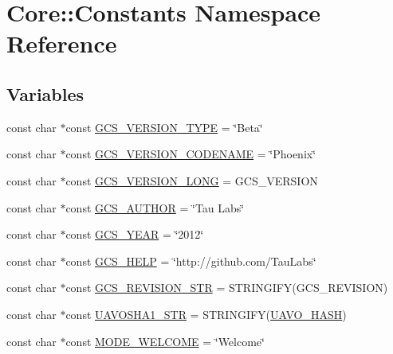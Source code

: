 \hypertarget{namespace_core_1_1_constants}{\section{\-Core\-:\-:\-Constants \-Namespace \-Reference}
\label{namespace_core_1_1_constants}
}
\subsection*{\-Variables}
\begin{DoxyCompactItemize}
\item 
const char $\ast$const \hyperlink{group___core_plugin_ga2f5847f505e3abb79af9a5dce306f252}{\-G\-C\-S\-\_\-\-V\-E\-R\-S\-I\-O\-N\-\_\-\-T\-Y\-P\-E} = \char`\"{}\-Beta\char`\"{}
\item 
const char $\ast$const \hyperlink{group___core_plugin_gad9af54d61e473a2cf1b31c9e834508fa}{\-G\-C\-S\-\_\-\-V\-E\-R\-S\-I\-O\-N\-\_\-\-C\-O\-D\-E\-N\-A\-M\-E} = \char`\"{}\-Phoenix\char`\"{}
\item 
const char $\ast$const \hyperlink{group___core_plugin_ga94cc5148063bb8fd71e94b6929e8c9ee}{\-G\-C\-S\-\_\-\-V\-E\-R\-S\-I\-O\-N\-\_\-\-L\-O\-N\-G} = \-G\-C\-S\-\_\-\-V\-E\-R\-S\-I\-O\-N
\item 
const char $\ast$const \hyperlink{group___core_plugin_ga0fc313e054a5095ee3ad71045b158aa6}{\-G\-C\-S\-\_\-\-A\-U\-T\-H\-O\-R} = \char`\"{}\-Tau \-Labs\char`\"{}
\item 
const char $\ast$const \hyperlink{group___core_plugin_ga97ec848a45099fd02d76df0a864d4c4a}{\-G\-C\-S\-\_\-\-Y\-E\-A\-R} = \char`\"{}2012\char`\"{}
\item 
const char $\ast$const \hyperlink{group___core_plugin_gaee8fed47fa9e32c041c48dbcbb51eac9}{\-G\-C\-S\-\_\-\-H\-E\-L\-P} = \char`\"{}http\-://github.\-com/\-Tau\-Labs\char`\"{}
\item 
const char $\ast$const \hyperlink{group___core_plugin_ga6978a5ac87f3d9dcd891f1be551d3b87}{\-G\-C\-S\-\_\-\-R\-E\-V\-I\-S\-I\-O\-N\-\_\-\-S\-T\-R} = \-S\-T\-R\-I\-N\-G\-I\-F\-Y(\-G\-C\-S\-\_\-\-R\-E\-V\-I\-S\-I\-O\-N)
\item 
const char $\ast$const \hyperlink{group___core_plugin_gaac836dc44aa34c08b486b01e3016f5c8}{\-U\-A\-V\-O\-S\-H\-A1\-\_\-\-S\-T\-R} = \-S\-T\-R\-I\-N\-G\-I\-F\-Y(\hyperlink{uavobjecttemplate_8m_a68fc75536e7a45155ef9f2214915c628}{\-U\-A\-V\-O\-\_\-\-H\-A\-S\-H})
\item 
const char $\ast$const \hyperlink{group___core_plugin_ga1b8ce8070e58b69888be921bbb6b03ce}{\-M\-O\-D\-E\-\_\-\-W\-E\-L\-C\-O\-M\-E} = \char`\"{}\-Welcome\char`\"{}

\end{DoxyCompactItemize}
